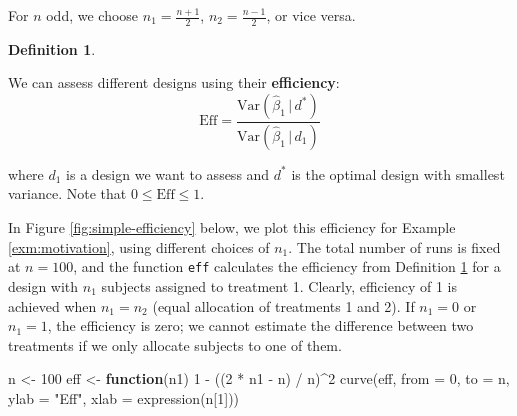 \documentclass[
]{book}
\newenvironment{Shaded}{\begin{snugshade}}{\end{snugshade}}
\newcommand{\AttributeTok}[1]{\textcolor[rgb]{0.77,0.63,0.00}{#1}}
\newcommand{\ControlFlowTok}[1]{\textcolor[rgb]{0.13,0.29,0.53}{\textbf{#1}}}
\newcommand{\DecValTok}[1]{\textcolor[rgb]{0.00,0.00,0.81}{#1}}
\newcommand{\FunctionTok}[1]{\textcolor[rgb]{0.00,0.00,0.00}{#1}}
\newcommand{\NormalTok}[1]{#1}
\newcommand{\OtherTok}[1]{\textcolor[rgb]{0.56,0.35,0.01}{#1}}
\newcommand{\SpecialCharTok}[1]{\textcolor[rgb]{0.00,0.00,0.00}{#1}}
\newcommand{\StringTok}[1]{\textcolor[rgb]{0.31,0.60,0.02}{#1}}
\theoremstyle{definition}
\newtheorem{definition}{Definition}[chapter]
\theoremstyle{definition}
\theoremstyle{definition}
\theoremstyle{definition}
\theoremstyle{remark}
\begin{document}
For \(n\) odd, we choose \(n_{1}=\frac{n+1}{2}\), \(n_{2}=\frac{n-1}{2}\), or vice versa.

\begin{definition}
\protect\hypertarget{def:simple-efficiency}{}\label{def:simple-efficiency}

We can assess different designs using their \textbf{efficiency}:
\begin{equation}
\textrm{Eff}=\frac{\textrm{Var}(\hat{\beta}_{1}\, |\, d^{*})}{\textrm{Var}(\hat{\beta}_{1}\, |\, d_{1})}
\label{eq:simple-efficiency}
\end{equation}

where \(d_{1}\) is a design we want to assess and \(d^{*}\) is the optimal design with smallest variance. Note that \(0\leq\textrm{Eff}\leq 1\).

\end{definition}

In Figure \ref{fig:simple-efficiency} below, we plot this efficiency for Example \ref{exm:motivation}, using different choices of \(n_1\). The total number of runs is fixed at \(n = 100\), and the function \texttt{eff} calculates the efficiency from Definition \ref{def:simple-efficiency} for a design with \(n_1\) subjects assigned to treatment 1. Clearly, efficiency of 1 is achieved when \(n_1 = n_2\) (equal allocation of treatments 1 and 2). If \(n_1=0\) or \(n_1 = 1\), the efficiency is zero; we cannot estimate the difference between two treatments if we only allocate subjects to one of them.



\begin{Shaded}
\begin{Highlighting}[]
\NormalTok{n }\OtherTok{\textless{}{-}} \DecValTok{100} 
\NormalTok{eff }\OtherTok{\textless{}{-}} \ControlFlowTok{function}\NormalTok{(n1) }\DecValTok{1} \SpecialCharTok{{-}}\NormalTok{ ((}\DecValTok{2} \SpecialCharTok{*}\NormalTok{ n1 }\SpecialCharTok{{-}}\NormalTok{ n) }\SpecialCharTok{/}\NormalTok{ n)}\SpecialCharTok{\^{}}\DecValTok{2} 
\FunctionTok{curve}\NormalTok{(eff, }\AttributeTok{from =} \DecValTok{0}\NormalTok{, }\AttributeTok{to =}\NormalTok{ n, }\AttributeTok{ylab =} \StringTok{"Eff"}\NormalTok{, }\AttributeTok{xlab =} \FunctionTok{expression}\NormalTok{(n[}\DecValTok{1}\NormalTok{]))}
\end{Highlighting}
\end{Shaded}
\end{document}
